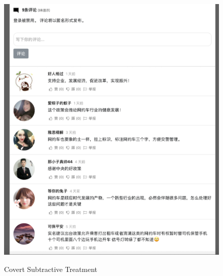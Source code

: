 \documentclass[11pt]{article}
\begin{document}
\begin{figure}
  \centering
  \caption{Covert Subtractive Treatment}
  \vspace{1em}
  \includegraphics[width=\textwidth]{figures/covert_subtractive.png}
  \label{covert_subtractive}
\end{figure}
\end{document}
